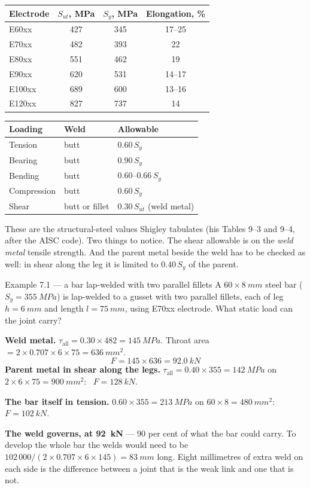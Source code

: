 \documentclass[11pt,a4paper]{article}
\begin{document}
\begin{center}\footnotesize
\begin{tabular}{@{}lccc@{}}
\toprule
\textbf{Electrode} & $S_{ut}$, MPa & $S_y$, MPa & Elongation, \%\\
\midrule
E60xx & 427 & 345 & 17--25\\
E70xx & 482 & 393 & 22\\
E80xx & 551 & 462 & 19\\
E90xx & 620 & 531 & 14--17\\
E100xx & 689 & 600 & 13--16\\
E120xx & 827 & 737 & 14\\
\bottomrule
\end{tabular}
\hfill
\begin{tabular}{@{}lll@{}}
\toprule
\textbf{Loading} & \textbf{Weld} & \textbf{Allowable}\\
\midrule
Tension & butt & $0.60\,S_y$\\
Bearing & butt & $0.90\,S_y$\\
Bending & butt & $0.60$--$0.66\,S_y$\\
Compression & butt & $0.60\,S_y$\\
Shear & butt or fillet & $0.30\,S_{ut}$ (weld metal)\\
\bottomrule
\end{tabular}
\end{center}

\noindent These are the structural-steel values Shigley tabulates (his Tables 9--3 and 9--4, after
the AISC code). Two things to notice. The shear allowable is on the \emph{weld metal} tensile
strength. And the parent metal beside the weld has to be checked as well: in shear along the leg
it is limited to $0.40\,S_y$ of the parent.

\begin{examplebox}{Example 7.1 --- a bar lap-welded with two parallel fillets}
A $60\times\SI{8}{mm}$ steel bar ($S_y=\SI{355}{MPa}$) is lap-welded to a gusset with two parallel
fillets, each of leg $h=\SI{6}{mm}$ and length $l=\SI{75}{mm}$, using E70xx electrode. What static
load can the joint carry?

\medskip
\textbf{Weld metal.} $\tau_{\text{all}}=0.30\times482=\SI{145}{MPa}$. Throat area
$=2\times0.707\times6\times75=\SI{636}{mm^2}$.
\[ F=145\times636=\SI{92.0}{kN} \]
\textbf{Parent metal in shear along the legs.} $\tau_{\text{all}}=0.40\times355=\SI{142}{MPa}$ on
$2\times6\times75=\SI{900}{mm^2}$: \ $F=\SI{128}{kN}$.

\textbf{The bar itself in tension.} $0.60\times355=\SI{213}{MPa}$ on $60\times8=\SI{480}{mm^2}$:
\ $F=\SI{102}{kN}$.

\medskip
\textbf{The weld governs, at \SI{92}{kN}} --- 90 per cent of what the bar could carry. To develop
the whole bar the welds would need to be $102\,000/(2\times0.707\times6\times145)=\SI{83}{mm}$
long. Eight millimetres of extra weld on each side is the difference between a joint that is the
weak link and one that is not.
\end{examplebox}
\end{document}

